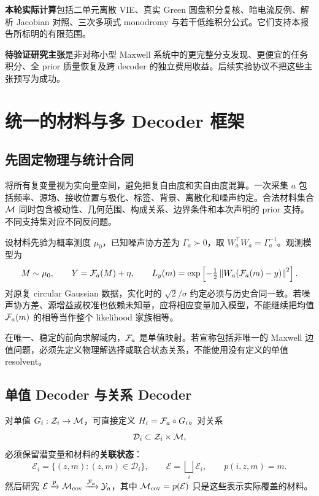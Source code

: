 \textbf{本轮实际计算}包括二单元离散 VIE、真实 Green 圆盘积分复核、暗电流反例、解析 Jacobian 对照、三次多项式 monodromy 与若干低维积分公式。它们支持本报告所标明的有限范围。

\textbf{待验证研究主张}是非对称小型 Maxwell 系统中的更完整分支发现、更便宜的任务积分、全 prior 质量恢复及跨 decoder 的独立费用收益。后续实验协议不把这些主张预写为成功。

\section{统一的材料与多 Decoder 框架}

\subsection{先固定物理与统计合同}

将所有复变量视为实向量空间，避免把复自由度和实自由度混算。一次采集 $a$ 包括频率、源场、接收位置与极化、标签、背景、离散化和噪声约定。合法材料集合 $\mathcal M$ 同时包含被动性、几何范围、构成关系、边界条件和本次声明的 prior 支持。不同支持集对应不同反问题。

设材料先验为概率测度 $\mu_0$，已知噪声协方差为 $\Gamma_a\succ0$，取 $W_a^\top W_a=\Gamma_a^{-1}$。观测模型为
\begin{equation}
M\sim\mu_0,\qquad Y={\mathcal F_a}(M)+\eta,\qquad
L_y(m)=\exp\left[-\tfrac12\left\lVert W_a({\mathcal F_a}(m)-y)\right\rVert^2\right].
\end{equation}
对原复 circular Gaussian 数据，实化时的 $\sqrt2/\sigma$ 约定必须与历史合同一致。若噪声协方差、源增益或校准也依赖未知量，应将相应变量加入模型，不能继续把均值 ${\mathcal F_a}(m)$ 的相等当作整个 likelihood 家族相等。

在唯一、稳定的前向求解域内，${\mathcal F_a}$ 是单值映射。若宣称包括非唯一的 Maxwell 边值问题，必须先定义物理解选择或联合状态关系，不能使用没有定义的单值 resolvent。

\subsection{单值 Decoder 与关系 Decoder}

对单值 $G_i:\mathcal Z_i\to\mathcal M$，可直接定义 $H_i={\mathcal F_a}\circ G_i$。对关系
\begin{equation}
\mathcal D_i\subset\mathcal Z_i\times\mathcal M,
\end{equation}
必须保留潜变量和材料的\textbf{关联状态}：
\begin{equation}
\mathcal E_i=\{(z,m):(z,m)\in\mathcal D_i\},\qquad
\mathcal E=\bigsqcup_i\mathcal E_i,\qquad p(i,z,m)=m.
\end{equation}
然后研究 $\mathcal E\xrightarrow{p}\mathcal M_{\rm cov}\xrightarrow{{\mathcal F_a}}\mathcal Y_a$，其中 $\mathcal M_{\rm cov}=p(\mathcal E)$ 只是这些表示实际覆盖的材料。

